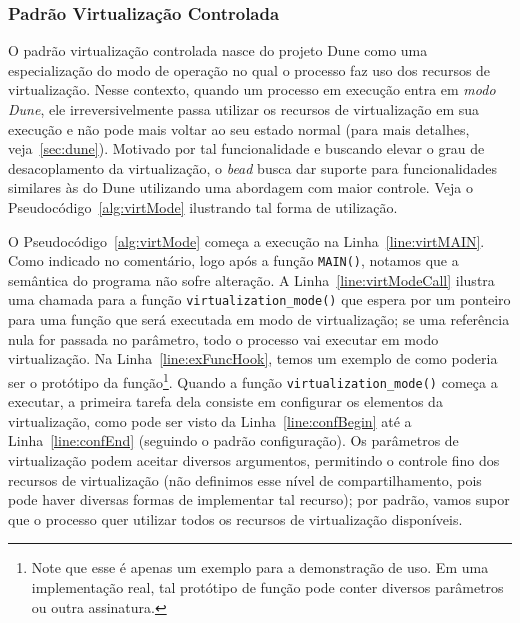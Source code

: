 \subsubsection{Padrão Virtualização Controlada}
\label{sec:virtctl}

O padrão virtualização controlada nasce do projeto Dune como uma especialização
do modo de operação no qual o processo faz uso dos recursos de virtualização.
Nesse contexto, quando um processo em execução entra em \emph{modo Dune}, ele
irreversivelmente passa utilizar os recursos de virtualização em sua execução e
não pode mais voltar ao seu estado normal (para mais detalhes,
veja~\ref{sec:dune}). Motivado por tal funcionalidade e buscando elevar o grau
de desacoplamento da virtualização, o \emph{bead} busca dar suporte para
funcionalidades similares às do Dune utilizando uma abordagem com maior
controle. Veja o Pseudocódigo~\ref{alg:virtMode} ilustrando tal forma de
utilização.



O Pseudocódigo~\ref{alg:virtMode} começa a execução na
Linha~\ref{line:virtMAIN}. Como indicado no comentário, logo após a função
\texttt{MAIN()}, notamos que a semântica do programa não sofre alteração. A
Linha~\ref{line:virtModeCall} ilustra uma chamada para a função
\texttt{virtualization\_mode()} que espera por um ponteiro para uma função que
será executada em modo de virtualização; se uma referência nula for passada no
parâmetro, todo o processo vai executar em modo virtualização. Na
Linha~\ref{line:exFuncHook}, temos um exemplo de como poderia ser o
protótipo da função\footnote{Note que esse é apenas um exemplo para a
demonstração de uso. Em uma implementação real, tal protótipo de função pode
conter diversos parâmetros ou outra assinatura.}. Quando a função
\texttt{virtualization\_mode()} começa a executar, a primeira tarefa dela
consiste em configurar os elementos da virtualização, como pode ser visto da
Linha~\ref{line:confBegin} até a Linha~\ref{line:confEnd} (seguindo o padrão
configuração). Os parâmetros de virtualização podem aceitar diversos argumentos,
permitindo o controle fino dos recursos de virtualização (não definimos esse
nível de compartilhamento, pois pode haver diversas formas de implementar tal
recurso); por padrão, vamos supor que o processo quer utilizar todos os
recursos de virtualização disponíveis.

